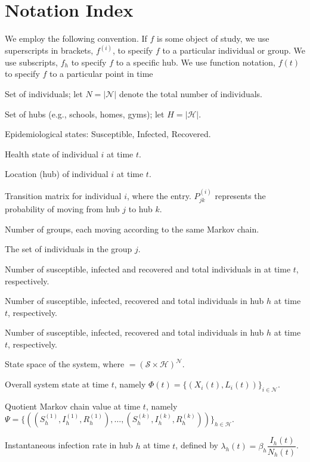 \documentclass[a4paper]{article}
\begin{document}
	\section*{Notation Index}
	We employ the following convention. If $f$ is some object of study, we use superscripts in brackets, $f^{(i)}$, to specify $f$ to a particular individual or group. We use subscripts, $f_{h}$ to specify $f$ to a specific hub. We use function notation, $f(t)$ to specify $f$ to a particular point in time
	\begin{description}[align=left, labelwidth=3cm, labelsep=1em, leftmargin=!]
		\item[$\mathcal{N}$] Set of individuals; let $N = |\mathcal{N}|$ denote the total number of individuals.
		\item[$\mathcal{H}$] Set of hubs (e.g., schools, homes, gyms); let $H = |\mathcal{H}|$.
		\item[$\mathcal{S} = \{S,I,R\}$] Epidemiological states: Susceptible, Infected, Recovered.
		\item[$X^{(i)}(t)$] Health state of individual $i$ at time $t$.
		\item[$L^{(i)}(t)$] Location (hub) of individual $i$ at time $t$.
		\item[$P^{(i)}$] Transition matrix for individual $i$, where the entry. $P^{(i)}_{jk}$ represents the probability of moving from hub $j$ to hub $k$.
		\item [$k$] Number of groups, each moving according to the same Markov chain.
		\item [$G^{(j)}$] The set of individuals in the group $j$.
		\item[$S(t)$, $I(t)$, $R(t)$] Number of susceptible, infected and recovered and total individuals in at time $t$, respectively.
		\item[$S_h(t)$, $I_h(t)$, $R_h(t)$] Number of susceptible, infected, recovered and total individuals in hub $h$ at time $t$, respectively.
		\item[$S^{(j)}_h(t)$, $I^{(j)}_h(t)$, $R^{(j)}_h(t)$] Number of susceptible, infected, recovered and total individuals in hub $h$ at time $t$, respectively.
		\item[$\mathcal{X}$] State space of the system, where $\mathcal = (\mathcal{S} \times \mathcal{H})^{\mathcal{N}}$.
		\item[$\Phi(t)$] Overall system state at time $t$, namely 
		$\Phi(t)=\{(X_i(t), L_i(t))\}_{i\in\mathcal{N}}$.
		\item[$\Psi(t)$] Quotient Markov chain value at time $t$, namely 
		$\Psi=\{((S^{(1)}_{h}, I^{(1)}_{h}, R^{(1)}_{h}), \dots, (S^{(k)}_{h}, I^{(k)}_{h}, R^{(k)}_{h}))\}_{h\in\mathcal{H}}$.
		\item[$\lambda_h(t)$] Instantaneous infection rate in hub $h$ at time $t$, defined by 
		$\lambda_h(t)=\beta_h\dfrac{\, I_h(t)}{N_h(t)}$.
	\end{description}
	\newpage
	
\end{document}
